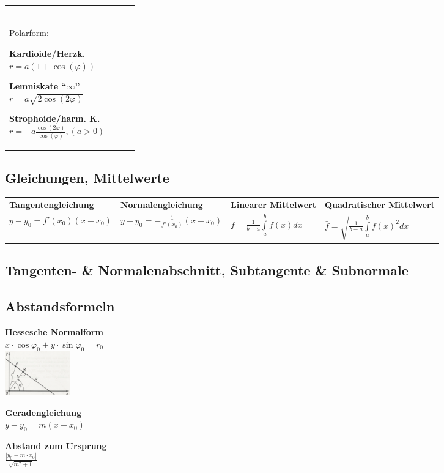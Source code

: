 \begin{tabular}{llll}
\parbox{2.7cm}{
\textbf{} \\
Polarform:
}

\parbox{5cm}{
\textbf{Kardioide/Herzk. } \\
$r = a(1+\cos(\varphi))$
}

\parbox{5cm}{
\textbf{Lemniskate ``$\infty$'' } \\
$r = a\sqrt{2\cos(2\varphi)}$ 
}

\parbox{5cm}{
\textbf{Strophoide/harm. K. } \\
$ r = -a \frac{\cos(2\varphi)}{\cos(\varphi)},(a>0) $ 
}

\end{tabular}

\subsection{Gleichungen, Mittelwerte}
\begin{tabular}{llll}
  \textbf{Tangentengleichung} &
  \textbf{Normalengleichung} &
  \textbf{Linearer Mittelwert} &
  \textbf{Quadratischer Mittelwert}\\
  $y-y_0=f'(x_0)(x-x_0)$ &
  $y-y_0=-\frac{1}{f'(x_0)}(x-x_0)$ &
  $\bar{f} = \frac{1}{b-a} \int\limits_{a}^{b} f(x)dx$ &
  $\bar{f} = \sqrt{\frac{1}{b-a} \int\limits_{a}^{b} f(x)^2dx}$
\end{tabular}
  
\subsection{Tangenten- \& Normalenabschnitt, Subtangente \& Subnormale}

\subsection{Abstandsformeln}
\begin{minipage}{6.5cm}
    \textbf{Hessesche Normalform}\\
    $x\cdot \cos\varphi_0 +y\cdot \sin\varphi_0=r_0$\\
    \includegraphics[width=2.8cm]{./bilder/hessenorm.png}
\end{minipage}
\begin{minipage}{6.5cm}
  \textbf{Geradengleichung} \\
  $y - y_0 = m (x - x_0)$
\end{minipage}
\begin{minipage}{6cm}
  \textbf{Abstand zum Ursprung} \\
  $\frac{|y_0 - m \cdot x_0|}{\sqrt{m^2 + 1}}$
\end{minipage}

